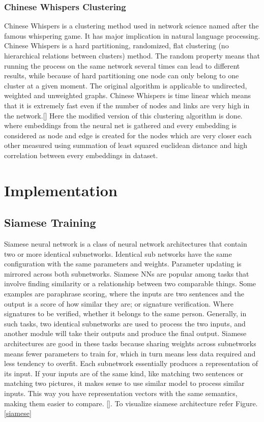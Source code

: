 \documentclass[a4paper,12pt, twoside]{NITKReport}
\begin{document}
\subsection{Chinese Whispers Clustering}
\par Chinese Whispers is a clustering method used in network science named after the famous whispering game. It has major implication in natural language processing. Chinese Whispers is a hard partitioning, randomized, flat clustering (no hierarchical relations between clusters) method. The random property means that running the process on the same network several times can lead to different results, while because of hard partitioning one node can only belong to one cluster at a given moment. The original algorithm is applicable to undirected, weighted and unweighted graphs. Chinese Whispers is time linear which means that it is extremely fast even if the number of nodes and links are very high in the network.[\cite{biemann2006chinese}] Here the modified version of this clustering algorithm is done. where embeddings from the neural net is gathered and every embedding is considered as node and edge is created for the nodes which are very closer each other measured using summation of least squared euclidean distance and high correlation between every embeddings in dataset.

\newpage
\chapter{Implementation}
\label{chap4}
\section{Siamese Training}
\par Siamese neural network is a class of neural network architectures that contain two or more identical subnetworks. Identical sub networks have the same configuration with the same parameters and weights. Parameter updating is mirrored across both subnetworks. Siamese NNs are popular among tasks that involve finding similarity or a relationship between two comparable things. Some examples are paraphrase scoring, where the inputs are two sentences and the output is a score of how similar they are; or signature verification. Where signatures to be verified, whether it belongs to the same person. Generally, in such tasks, two identical subnetworks are used to process the two inputs, and another module will take their outputs and produce the final output. Siamese architectures are good in these tasks because sharing weights across subnetworks means fewer parameters to train for, which in turn means less data required and less tendency to overfit. Each subnetwork essentially produces a representation of its input. If your inputs are of the same kind, like matching two sentences or matching two pictures, it makes sense to use similar model to process similar inputs. This way you have representation vectors with the same semantics, making them easier to compare. [\cite{bromley1993reputation}]. To visualize siamese architecture refer Figure.\ref{siamese}
\end{document}
